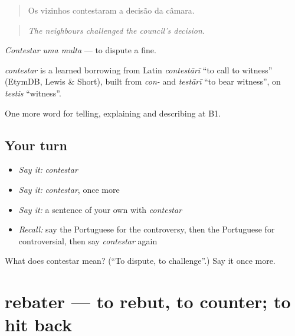 \begin{quote}
Os vizinhos contestaram a decisão da câmara.
\end{quote}

\begin{quote}
\emph{The neighbours challenged the council's decision.}
\end{quote}

\emph{Contestar uma multa} — to dispute a fine.

\begin{cousinweb}
\emph{contestar} is a learned borrowing from Latin \emph{contestārī} \textquotedblleft{}to call to witness\textquotedblright{} (EtymDB, Lewis \& Short), built from \emph{con-} and \emph{testārī} \textquotedblleft{}to bear witness\textquotedblright{}, on \emph{testis} \textquotedblleft{}witness\textquotedblright{}.
\end{cousinweb}

\begin{grammarlens}[title={What you've built}]
One more word for telling, explaining and describing at B1.
\end{grammarlens}

\subsection*{Your turn}
\begin{itemize}
\raggedright
  \item \emph{Say it:} \emph{contestar}
  \item \emph{Say it:} \emph{contestar}, once more
  \item \emph{Say it:} a sentence of your own with \emph{contestar}
  \item \emph{Recall:} say the Portuguese for the controversy, then the Portuguese for controversial, then say \emph{contestar} again
\end{itemize}

\begin{tcolorbox}[breakable,colback=teal!4,colframe=teal!35!black,title={Before you move on}]
What does contestar mean? (\textquotedblleft{}To dispute, to challenge\textquotedblright{}.) Say it once more.
\end{tcolorbox}
\section[rebater]{rebater — to rebut, to counter; to hit back}

\label{lesson:PT-C347-rebater}



